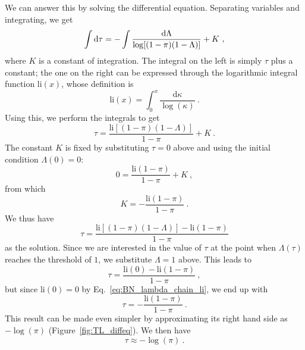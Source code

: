 \documentclass[11pt]{article}
\newcommand{\ud}{\text{d}}
\let\originalleft\left
\let\originalright\right
\renewcommand{\left}{\mathopen{}\mathclose\bgroup\originalleft}
\renewcommand{\right}{\aftergroup\egroup\originalright}
\begin{document}
We can answer this by solving the differential equation. Separating variables and integrating, we get
\begin{equation}
  \label{eq:BN_lambda_chain_12}
  \int \ud \tau =
  - \int \frac{\ud \Lambda}{\log \left[ (1 - \pi) (1 - \Lambda) \right]} + K \ ,
\end{equation}
where $K$ is a constant of integration. The integral on the left is simply $\tau$ plus a constant; the one on the right can be expressed through the logarithmic integral function $\text{li}(x)$, whose definition is
\begin{equation}
  \label{eq:BN_lambda_chain_li}
  \text{li}(x) =  \int_0^x \frac{\ud \kappa}{\log(\kappa)} \ .
\end{equation}
Using this, we perform the integrals to get
\begin{equation}
  \label{eq:BN_lambda_chain_13}
  \tau = \frac{\text{li}[(1-\pi)(1-\Lambda)]}{1-\pi} + K \ .
\end{equation}
The constant $K$ is fixed by substituting $\tau=0$ above and using the initial condition $\Lambda(0)=0$:
\begin{equation}
  \label{eq:BN_lambda_chain_14}
  0 = \frac{\text{li}(1-\pi)}{1-\pi} + K \ ,
\end{equation}
from which
\begin{equation}
  \label{eq:BN_lambda_chain_15}
  K = - \frac{\text{li}(1-\pi)}{1-\pi} \ .
\end{equation}
We thus have
\begin{equation}
  \label{eq:BN_lambda_chain_16}
  \tau = \frac{\text{li}[(1-\pi)(1-\Lambda)] - \text{li}(1-\pi)}{1-\pi}
\end{equation}
as the solution. Since we are interested in the value of $\tau$ at the point when $\Lambda(\tau)$ reaches the threshold of $1$, we substitute $\Lambda=1$ above. This leads to
\begin{equation}
  \label{eq:BN_lambda_chain_17}
  \tau = \frac{\text{li}(0) - \text{li}(1-\pi)}{1-\pi} \ ,
\end{equation}
but since $\text{li}(0)=0$ by Eq.~\ref{eq:BN_lambda_chain_li}, we end up with
\begin{equation}
  \label{eq:BN_lambda_chain_18}
  \tau = - \frac{\text{li}(1-\pi)}{1-\pi} \ .
\end{equation}
This result can be made even simpler by approximating its right hand side as $-\log(\pi)$ (Figure~\ref{fig:TL_diffeq}). We then have
\begin{equation}
  \label{eq:BN_lambda_chain_19}
  \tau \approx - \log(\pi) \ .
\end{equation}
\end{document}
